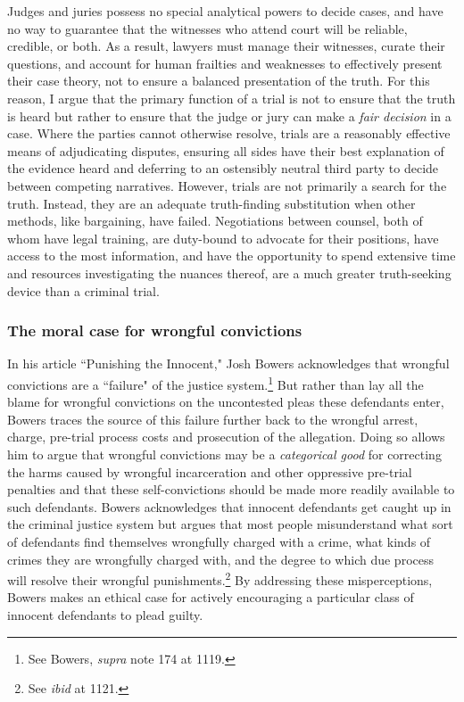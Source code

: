 Judges and juries possess no special analytical powers to decide cases, and have no way to guarantee that the witnesses who attend court will be reliable, credible, or both. As a result, lawyers must manage their witnesses, curate their questions, and account for human frailties and weaknesses to effectively present their case theory, not to ensure a balanced presentation of the truth. For this reason, I argue that the primary function of a trial is not to ensure that the truth is heard but rather to ensure that the judge or jury can make a \textit{fair decision} in a case. Where the parties cannot otherwise resolve, trials are a reasonably effective means of adjudicating disputes, ensuring all sides have their best explanation of the evidence heard and deferring to an ostensibly neutral third party to decide between competing narratives. However, trials are not primarily a search for the truth. Instead, they are an adequate truth-finding substitution when other methods, like bargaining, have failed. Negotiations between counsel, both of whom have legal training, are duty-bound to advocate for their positions, have access to the most information, and have the opportunity to spend extensive time and resources investigating the nuances thereof, are a much greater truth-seeking device than a criminal trial.

\subsubsection{The moral case for wrongful convictions}

In his article ``Punishing the Innocent," Josh Bowers acknowledges that wrongful convictions are a ``failure" of the justice system.\footnote{See Bowers, \textit{supra} note 174 at 1119.} But rather than lay all the blame for wrongful convictions on the uncontested pleas these defendants enter, Bowers traces the source of this failure further back to the wrongful arrest, charge, pre-trial process costs and prosecution of the allegation. Doing so allows him to argue that wrongful convictions may be a \textit{categorical good} for correcting the harms caused by wrongful incarceration and other oppressive pre-trial penalties and that these self-convictions should be made more readily available to such defendants. Bowers acknowledges that innocent defendants get caught up in the criminal justice system but argues that most people misunderstand what sort of defendants find themselves wrongfully charged with a crime, what kinds of crimes they are wrongfully charged with, and the degree to which due process will resolve their wrongful punishments.\footnote{See \textit{ibid} at 1121.} By addressing these misperceptions, Bowers makes an ethical case for actively encouraging a particular class of innocent defendants to plead guilty.

